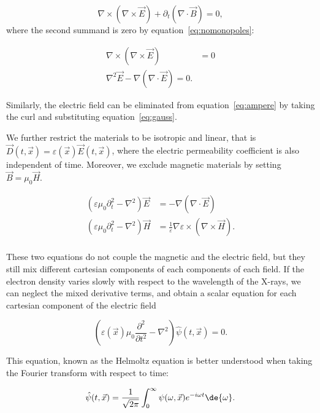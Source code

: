 \begin{equation}
    \nabla \times (\nabla \times \vec{E}) + \partial_t(\nabla \cdot \vec{B}) = 0,
    \label{<++>}
\end{equation}
where the second summand is zero by equation~\eqref{eq:nomonopoles}:

\begin{align}
    \nabla \times (\nabla \times \vec{E}) &= 0\\
    \nabla^2 \vec{E} - \nabla (\nabla \cdot \vec{E}) = 0.
    \label{<++>}
\end{align}

Similarly, the electric field can be eliminated from
equation~\eqref{eq:ampere} by taking the curl and substituting
equation~\eqref{eq:gauss}.

We further restrict the materials to be isotropic and linear, that is
$\vec{D}(t, \vec{x}) = \varepsilon(\vec{x}) \vec{E}(t, \vec{x})$, where the
electric permeability coefficient is also independent of time. Moreover, we
exclude magnetic materials by setting $\vec{B} = \mu_0 \vec{H}$.

\begin{align*}
    \left(\varepsilon \mu_0 \partial^2_t - \nabla^2 \right)
    \vec{E} &= - \nabla(\nabla \cdot \vec{E}) \\
    \left(\varepsilon \mu_0 \partial^2_t - \nabla^2 \right)
    \vec{H} &= \frac{1}{\varepsilon}\nabla \varepsilon \times (\nabla \times
    \vec{H}).\\
\end{align*}

These two equations do not couple the magnetic and the electric field, but
they still mix different cartesian components of each components of each
field. If the electron density varies slowly with respect to the wavelength
of the X-rays, we can neglect the mixed derivative terms, and obtain a
scalar equation for each cartesian component of the electric field

\begin{equation}
    \left( \varepsilon(\vec{x}) \mu_0 \frac{\partial^2}{\partial t^2} - \nabla^2
    \right) \hat{\psi}(t, \vec{x}) = 0.\label{eq:helmoltz.spacetime}
\end{equation}

This equation, known as the Helmoltz equation is better understood when
taking the Fourier transform with respect to time:

\begin{equation*}
    \hat{\psi}(t, \vec{x}) =
    \frac{1}{\sqrt{2\pi}}\int_{0}^{\infty}\psi(\omega, \vec{x})
    e^{-i \omega t} \de{\omega}.
\end{equation*}

